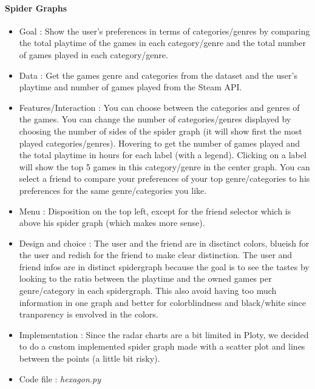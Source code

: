 \documentclass{article}
\begin{document}
	\paragraph{Spider Graphs}
	\begin{itemize}
		\item Goal : Show the user's preferences in terms of categories/genres by comparing the total playtime of the games in each category/genre and the total number of games played in each category/genre.
		\item Data : Get the games genre and categories from the dataset and the user's playtime and number of games played from the Steam API.
		\item Features/Interaction : You can choose between the categories and genres of the games. You can change the number of categories/genres displayed by choosing the number of sides of the spider graph (it will show first the most played categories/genres). Hovering to get the number of games played and the total playtime in hours for each label (with a legend). Clicking on a label will show the top 5 games in this category/genre in the center graph. You can select a friend to compare your preferences of your top genre/categories to his preferences for the same genre/categories you like.
		\item Menu : Disposition on the top left, except for the friend selector which is above his spider graph (which makes more sense).
		\item Design and choice : The user and the friend are in disctinct colors, blueish for the user and redish for the friend to make clear distinction. The user and friend infos are in distinct spidergraph because the goal is to see the tastes by looking to the ratio between the playtime and the owned games per genre/category in each spidergraph. This also avoid having too much information in one graph and better for colorblindness and black/white since tranparency is envolved in the colors.
		\item Implementation : Since the radar charts are a bit limited in Ploty, we decided to do a custom implemented spider graph made with a scatter plot and lines between the points (a little bit risky).
		\item Code file : \textit{hexagon.py}
	\end{itemize}
\end{document}
